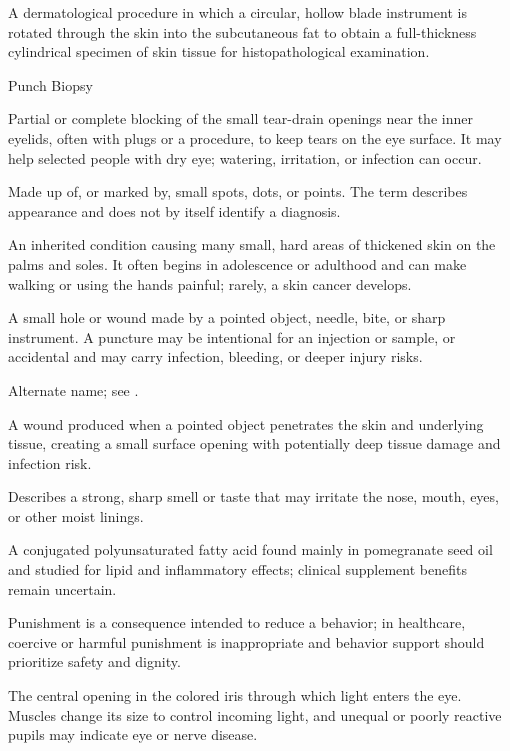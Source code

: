  A dermatological procedure in which a circular, hollow blade instrument is rotated through the skin into the subcutaneous fat to obtain a full-thickness cylindrical specimen of skin tissue for histopathological examination.

\synonyms
Punch Biopsy

 Partial or complete blocking of the small tear-drain openings near the inner eyelids, often with plugs or a procedure, to keep tears on the eye surface. It may help selected people with dry eye; watering, irritation, or infection can occur.

 Made up of, or marked by, small spots, dots, or points. The term describes appearance and does not by itself identify a diagnosis.

 An inherited condition causing many small, hard areas of thickened skin on the palms and soles. It often begins in adolescence or adulthood and can make walking or using the hands painful; rarely, a skin cancer develops.

 A small hole or wound made by a pointed object, needle, bite, or sharp instrument. A puncture may be intentional for an injection or sample, or accidental and may carry infection, bleeding, or deeper injury risks.

 Alternate name; see .

 A wound produced when a pointed object penetrates the skin and underlying tissue, creating a small surface opening with potentially deep tissue damage and infection risk.

 Describes a strong, sharp smell or taste that may irritate the nose, mouth, eyes, or other moist linings.

 A conjugated polyunsaturated fatty acid found mainly in pomegranate seed oil and studied for lipid and inflammatory effects; clinical supplement benefits remain uncertain.

 Punishment is a consequence intended to reduce a behavior; in healthcare, coercive or harmful punishment is inappropriate and behavior support should prioritize safety and dignity.

 The central opening in the colored iris through which light enters the eye. Muscles change its size to control incoming light, and unequal or poorly reactive pupils may indicate eye or nerve disease.

